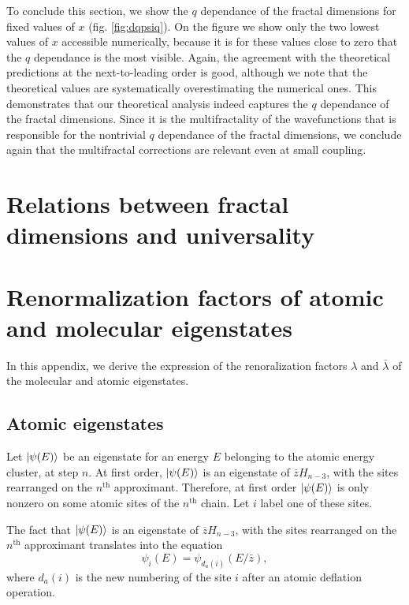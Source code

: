 \documentclass[11pt]{article}
\newcommand{\zb}{\ensuremath{\overline{z}}}
\begin{document}
To conclude this section, we show the $q$ dependance of the fractal dimensions for fixed values of $x$ (fig. \eqref{fig:dqpsiq}).
On the figure we show only the two lowest values of $x$ accessible numerically, because it is for these values close to zero that the $q$ dependance is the most visible. 
Again, the agreement with the theoretical predictions at the next-to-leading order is good, although we note that the theoretical values are systematically overestimating the numerical ones.
This demonstrates that our theoretical analysis indeed captures the $q$ dependance of the fractal dimensions.
Since it is the multifractality of the wavefunctions that is responsible for the nontrivial $q$ dependance of the fractal dimensions, we conclude again that the multifractal corrections are relevant even at small coupling.

\section{Relations between fractal dimensions and universality}

\newpage
\appendix

\section{Renormalization factors of atomic and molecular eigenstates}
\label{app:renorm}

In this appendix, we derive the expression of the renoralization factors $\lambda$ and $\bar \lambda$ of the molecular and atomic eigenstates.

\subsection{Atomic eigenstates}

Let $\ket{\psi(E)}$ be an eigenstate for an energy $E$ belonging to the atomic energy cluster, at step $n$.
At first order, $\ket{\psi(E)}$ is an eigenstate of $\zb H_{n-3}$, with the sites rearranged on the $n^\text{th}$ approximant.
Therefore, at first order $\ket{\psi(E)}$ is only nonzero on some atomic sites of the $n^\text{th}$ chain. Let $i$ label one of these sites.

The fact that $\ket{\psi(E)}$ is an eigenstate of $\zb H_{n-3}$, with the sites rearranged on the $n^\text{th}$ approximant translates into the equation
\begin{equation}
\label{eq:renorm_a_first}
	\psi_i(E) = \psi_{d_a(i)}(E/\bar z),
\end{equation}
where $d_a(i)$ is the new numbering of the site $i$ after an atomic deflation operation.
\end{document}
